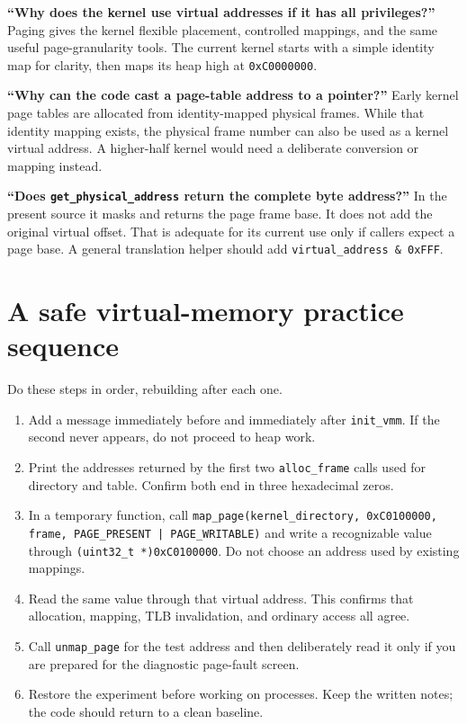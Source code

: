 \textbf{``Why does the kernel use virtual addresses if it has all privileges?''} Paging gives the kernel flexible placement, controlled mappings, and the same useful page-granularity tools. The current kernel starts with a simple identity map for clarity, then maps its heap high at \texttt{0xC0000000}.

\textbf{``Why can the code cast a page-table address to a pointer?''} Early kernel page tables are allocated from identity-mapped physical frames. While that identity mapping exists, the physical frame number can also be used as a kernel virtual address. A higher-half kernel would need a deliberate conversion or mapping instead.

\textbf{``Does \texttt{get\_physical\_address} return the complete byte address?''} In the present source it masks and returns the page frame base. It does not add the original virtual offset. That is adequate for its current use only if callers expect a page base. A general translation helper should add \texttt{virtual\_address \& 0xFFF}.

\section{A safe virtual-memory practice sequence}
Do these steps in order, rebuilding after each one.
\begin{enumerate}
\item Add a message immediately before and immediately after \texttt{init\_vmm}. If the second never appears, do not proceed to heap work.
\item Print the addresses returned by the first two \texttt{alloc\_frame} calls used for directory and table. Confirm both end in three hexadecimal zeros.
\item In a temporary function, call \texttt{map\_page(kernel\_directory, 0xC0100000, frame, PAGE\_PRESENT | PAGE\_WRITABLE)} and write a recognizable value through \texttt{(uint32\_t *)0xC0100000}. Do not choose an address used by existing mappings.
\item Read the same value through that virtual address. This confirms that allocation, mapping, TLB invalidation, and ordinary access all agree.
\item Call \texttt{unmap\_page} for the test address and then deliberately read it only if you are prepared for the diagnostic page-fault screen.
\item Restore the experiment before working on processes. Keep the written notes; the code should return to a clean baseline.
\end{enumerate}

